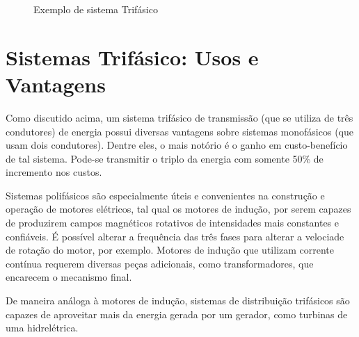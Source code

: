 \documentclass[12pt,a4paper,openany]{abntex2}
\begin{document}
\begin{figure}[!htp]
	\centering
		\caption{Exemplo de sistema Trifásico}
	\label{fig:sinal-trifasico}
\end{figure}


\section{Sistemas Trifásico: Usos e Vantagens}

Como discutido acima, um sistema trifásico de transmissão (que se utiliza de três condutores) de energia possui diversas vantagens sobre sistemas monofásicos (que usam dois condutores). Dentre eles, o mais notório é o ganho em custo-benefício de tal sistema. Pode-se transmitir o triplo da energia com somente 50\% de incremento nos custos.

Sistemas polifásicos são especialmente úteis e convenientes na construção e operação de motores elétricos, tal qual os motores de indução, por serem capazes de produzirem campos magnéticos rotativos de intensidades mais constantes e confiáveis. É possível alterar a frequência das três fases para alterar a velociade de rotação do motor, por exemplo. Motores de indução que utilizam corrente contínua requerem diversas peças adicionais, como transformadores, que encarecem o mecanismo final.

De maneira análoga à motores de indução, sistemas de distribuição trifásicos são capazes de aproveitar mais da energia gerada por um gerador, como turbinas de uma hidrelétrica.
\end{document}
